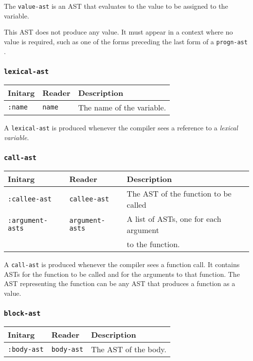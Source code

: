 The \texttt{value-ast} is an AST that evaluates to the value to be
assigned to the variable.

This AST does not produce any value.  It must appear in a context
where no value is required, such as one of the forms preceding the
last form of a \texttt{progn-ast} .

\subsubsection{\texttt{lexical-ast}}
\label{lexical-ast}

\begin{tabular}{|l|l|l|}
\hline
Initarg & Reader & Description\\
\hline\hline
\texttt{:name} & \texttt{name} & The name of the variable.\\  
\hline
\end{tabular}

A \texttt{lexical-ast} is produced whenever the compiler sees a
reference to a \emph{lexical variable}. 

\subsubsection{\texttt{call-ast}}
\label{call-ast}

\begin{tabular}{|l|l|l|}
\hline
Initarg & Reader & Description\\
\hline\hline
\texttt{:callee-ast} & \texttt{callee-ast} & The AST of the function
to be called\\  
\hline
\texttt{:argument-asts} & \texttt{argument-asts} & A list of ASTs, one
for each argument\\
& & to the function.\\
\hline
\end{tabular}

A \texttt{call-ast} is produced whenever the compiler sees a function
call.  It contains ASTs for the function to be called and for the
arguments to that function.  The AST representing the function can be
any AST that produces a function as a value.

\subsubsection{\texttt{block-ast}}
\label{block-ast}

\begin{tabular}{|l|l|l|}
\hline
Initarg & Reader & Description\\
\hline\hline
\texttt{:body-ast} & \texttt{body-ast} & The AST of the body.\\
\hline
\end{tabular}

